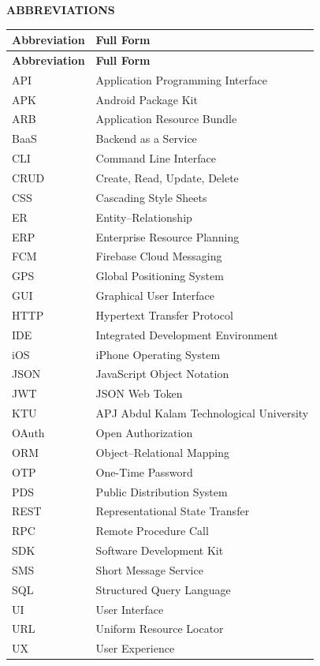 \begin{center}
{\LARGE \textbf{ABBREVIATIONS}}
\end{center}

\vspace{1cm}

\begin{longtable}{@{}p{3.5cm} p{10cm}@{}}
\toprule
\textbf{Abbreviation} & \textbf{Full Form} \\
\midrule
\endfirsthead
\toprule
\textbf{Abbreviation} & \textbf{Full Form} \\
\midrule
\endhead
API & Application Programming Interface \\
APK & Android Package Kit \\
ARB & Application Resource Bundle \\
BaaS & Backend as a Service \\
CLI & Command Line Interface \\
CRUD & Create, Read, Update, Delete \\
CSS & Cascading Style Sheets \\
ER & Entity--Relationship \\
ERP & Enterprise Resource Planning \\
FCM & Firebase Cloud Messaging \\
GPS & Global Positioning System \\
GUI & Graphical User Interface \\
HTTP & Hypertext Transfer Protocol \\
IDE & Integrated Development Environment \\
iOS & iPhone Operating System \\
JSON & JavaScript Object Notation \\
JWT & JSON Web Token \\
KTU & APJ Abdul Kalam Technological University \\
OAuth & Open Authorization \\
ORM & Object--Relational Mapping \\
OTP & One-Time Password \\
PDS & Public Distribution System \\
REST & Representational State Transfer \\
RPC & Remote Procedure Call \\
SDK & Software Development Kit \\
SMS & Short Message Service \\
SQL & Structured Query Language \\
UI & User Interface \\
URL & Uniform Resource Locator \\
UX & User Experience \\
\bottomrule
\end{longtable}
